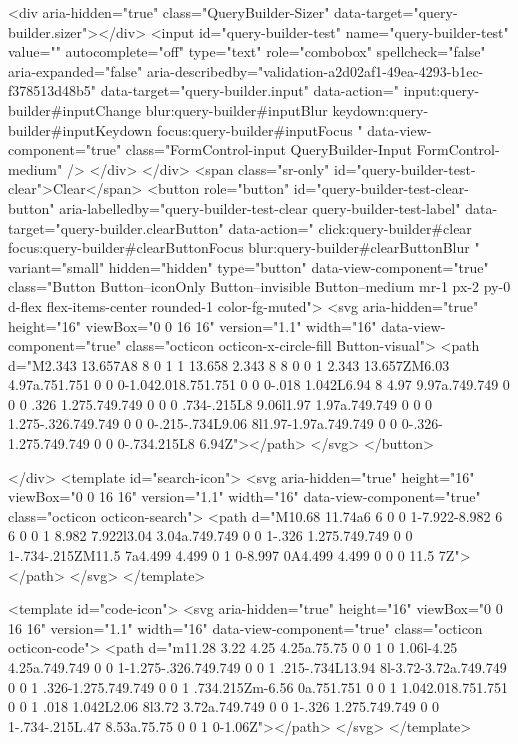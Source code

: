             <div aria-hidden="true" class="QueryBuilder-Sizer" data-target="query-builder.sizer"></div>
            <input id="query-builder-test" name="query-builder-test" value="" autocomplete="off" type="text" role="combobox" spellcheck="false" aria-expanded="false" aria-describedby="validation-a2d02af1-49ea-4293-b1ec-f378513d48b5" data-target="query-builder.input" data-action="
          input:query-builder#inputChange
          blur:query-builder#inputBlur
          keydown:query-builder#inputKeydown
          focus:query-builder#inputFocus
        " data-view-component="true" class="FormControl-input QueryBuilder-Input FormControl-medium" />
          </div>
        </div>
          <span class="sr-only" id="query-builder-test-clear">Clear</span>
          <button role="button" id="query-builder-test-clear-button" aria-labelledby="query-builder-test-clear query-builder-test-label" data-target="query-builder.clearButton" data-action="
                click:query-builder#clear
                focus:query-builder#clearButtonFocus
                blur:query-builder#clearButtonBlur
              " variant="small" hidden="hidden" type="button" data-view-component="true" class="Button Button--iconOnly Button--invisible Button--medium mr-1 px-2 py-0 d-flex flex-items-center rounded-1 color-fg-muted">  <svg aria-hidden="true" height="16" viewBox="0 0 16 16" version="1.1" width="16" data-view-component="true" class="octicon octicon-x-circle-fill Button-visual">
    <path d="M2.343 13.657A8 8 0 1 1 13.658 2.343 8 8 0 0 1 2.343 13.657ZM6.03 4.97a.751.751 0 0 0-1.042.018.751.751 0 0 0-.018 1.042L6.94 8 4.97 9.97a.749.749 0 0 0 .326 1.275.749.749 0 0 0 .734-.215L8 9.06l1.97 1.97a.749.749 0 0 0 1.275-.326.749.749 0 0 0-.215-.734L9.06 8l1.97-1.97a.749.749 0 0 0-.326-1.275.749.749 0 0 0-.734.215L8 6.94Z"></path>
</svg>
</button>

      </div>
      <template id="search-icon">
  <svg aria-hidden="true" height="16" viewBox="0 0 16 16" version="1.1" width="16" data-view-component="true" class="octicon octicon-search">
    <path d="M10.68 11.74a6 6 0 0 1-7.922-8.982 6 6 0 0 1 8.982 7.922l3.04 3.04a.749.749 0 0 1-.326 1.275.749.749 0 0 1-.734-.215ZM11.5 7a4.499 4.499 0 1 0-8.997 0A4.499 4.499 0 0 0 11.5 7Z"></path>
</svg>
</template>

<template id="code-icon">
  <svg aria-hidden="true" height="16" viewBox="0 0 16 16" version="1.1" width="16" data-view-component="true" class="octicon octicon-code">
    <path d="m11.28 3.22 4.25 4.25a.75.75 0 0 1 0 1.06l-4.25 4.25a.749.749 0 0 1-1.275-.326.749.749 0 0 1 .215-.734L13.94 8l-3.72-3.72a.749.749 0 0 1 .326-1.275.749.749 0 0 1 .734.215Zm-6.56 0a.751.751 0 0 1 1.042.018.751.751 0 0 1 .018 1.042L2.06 8l3.72 3.72a.749.749 0 0 1-.326 1.275.749.749 0 0 1-.734-.215L.47 8.53a.75.75 0 0 1 0-1.06Z"></path>
</svg>
</template>

